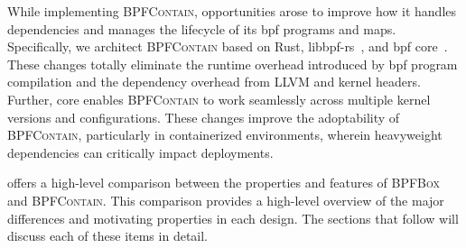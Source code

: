 \documentclass[
  fontsize=12pt,
  titlepage=firstiscover,
  paper=letter,
oneside,
  cleardoublepage=plain,
  parskip=half-,
  DIV=10,
  parindent,
  appendixprefix,
  chapterprefix,
  listof=totoc,
]{scrbook}
\newcommand{\bpfbox}{\textsc{BPFBox}}
\newcommand{\bpfcontain}{\textsc{BPFContain}}
\begin{document}
While implementing \bpfcontain{}, opportunities arose to improve how it handles
dependencies and manages the lifecycle of its \gls{bpf} programs and maps. Specifically,
we architect \bpfcontain{} based on Rust, libbpf-rs~\cite{libbpf-rs}, and \gls{bpf}
\gls{core}~\cite{nakryiko2020_core}. These changes totally eliminate the runtime overhead
introduced by \gls{bpf} program compilation and the dependency overhead from LLVM and
kernel headers. Further, \gls{core} enables \bpfcontain{} to work seamlessly across
multiple kernel versions and configurations. These changes improve the adoptability of
\bpfcontain{}, particularly in containerized environments, wherein heavyweight
dependencies can critically impact deployments.

 offers a high-level comparison between the properties and
features of \bpfbox{} and \bpfcontain{}. This comparison provides a high-level overview of
the major differences and motivating properties in each design. The sections that follow
will discuss each of these items in detail.
\end{document}
